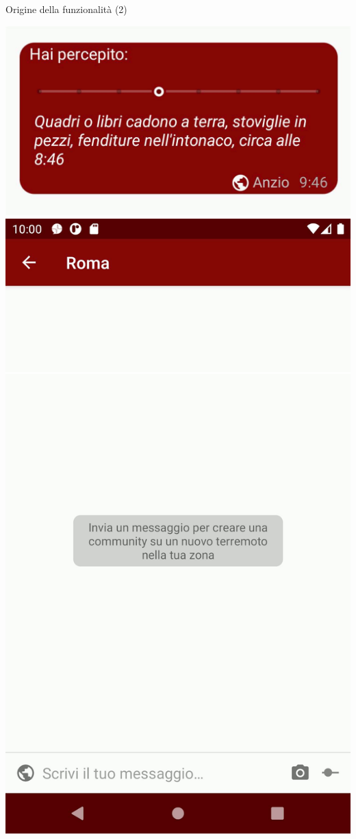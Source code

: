 \documentclass[compress]{beamer}
\begin{document}
\begin{frame}[c]{Origine della funzionalità (2)}
\begin{center}
\includegraphics[scale=0.5]{assets/02/slider.png}
\hspace{2em}
\includegraphics[scale=0.3]{assets/02/nuova_chat.png}
\end{center}
\end{frame}
\end{document}
